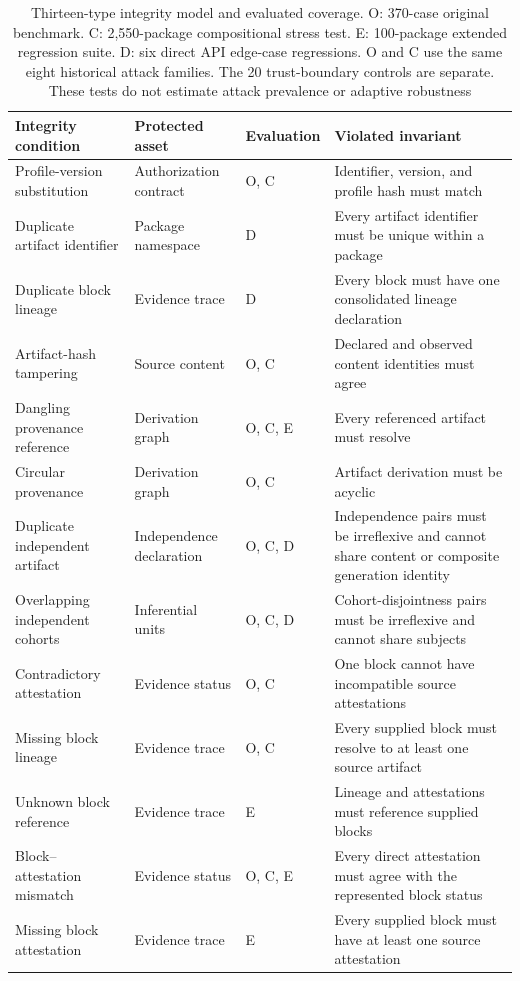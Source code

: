 \documentclass[11pt,a4paper]{article}
\begin{document}
\begin{table}[!htbp]
\centering
\caption{Thirteen-type integrity model and evaluated coverage. O: 370-case original benchmark. C: 2,550-package compositional stress test. E: 100-package extended regression suite. D: six direct API edge-case regressions. O and C use the same eight historical attack families. The 20 trust-boundary controls are separate. These tests do not estimate attack prevalence or adaptive robustness}
\label{tab:integrity-threat-model}
\scriptsize
\renewcommand{\arraystretch}{1.06}
\begin{tabularx}{\textwidth}{@{}P{0.24\textwidth}P{0.16\textwidth}P{0.11\textwidth}Y@{}}
\toprule
Integrity condition & Protected asset & Evaluation & Violated invariant \\
\midrule
Profile-version substitution & Authorization contract & O, C & Identifier, version, and profile hash must match \\
Duplicate artifact identifier & Package namespace & D & Every artifact identifier must be unique within a package \\
Duplicate block lineage & Evidence trace & D & Every block must have one consolidated lineage declaration \\
Artifact-hash tampering & Source content & O, C & Declared and observed content identities must agree \\
Dangling provenance reference & Derivation graph & O, C, E & Every referenced artifact must resolve \\
Circular provenance & Derivation graph & O, C & Artifact derivation must be acyclic \\
Duplicate independent artifact & Independence declaration & O, C, D & Independence pairs must be irreflexive and cannot share content or composite generation identity \\
Overlapping independent cohorts & Inferential units & O, C, D & Cohort-disjointness pairs must be irreflexive and cannot share subjects \\
Contradictory attestation & Evidence status & O, C & One block cannot have incompatible source attestations \\
Missing block lineage & Evidence trace & O, C & Every supplied block must resolve to at least one source artifact \\
Unknown block reference & Evidence trace & E & Lineage and attestations must reference supplied blocks \\
Block--attestation mismatch & Evidence status & O, C, E & Every direct attestation must agree with the represented block status \\
Missing block attestation & Evidence trace & E & Every supplied block must have at least one source attestation \\
\bottomrule
\end{tabularx}
\end{table}
\end{document}
